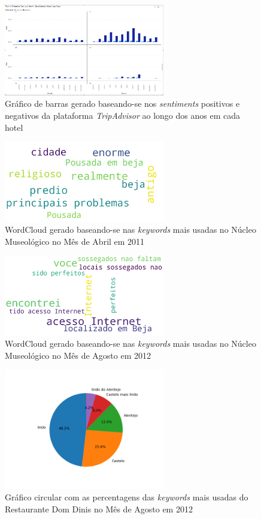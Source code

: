 \begin{figure}[!htb]
\centering
\includegraphics[width=7cm]{figuras/Pos&NegSentimentsPerMonth&BusinessType/2.PNG}
\caption{Gráfico de barras gerado baseando-se nos \textit{sentiments} positivos e negativos da plataforma \textit{TripAdvisor} ao longo dos anos em cada hotel}
\label{fig:exemplofig}
\end{figure}

\begin{figure}[!htb]
\centering
\includegraphics[width=7cm]{figuras/WordClouds/wordcloud_abril_of_2011_at_business33.png}
\caption{WordCloud gerado baseando-se nas \textit{keywords} mais usadas no Núcleo Museológico no Mês de Abril em 2011}
\label{fig:exemplofig}
\end{figure}

\begin{figure}[!htb]
\centering
\includegraphics[width=7cm]{figuras/WordClouds/wordcloud_agosto_of_2012_at_business33.png}
\caption{WordCloud gerado baseando-se nas \textit{keywords} mais usadas no Núcleo Museológico no Mês de Agosto em 2012}
\label{fig:exemplofig}
\end{figure}

\begin{figure}[!htb]
\centering
\includegraphics[width=7cm]{figuras/Graficos_Circulares_keyword/circular_keywords_agosto_of_2012_at_business2.png}
\caption{Gráfico circular com as percentagens das \textit{keywords} mais usadas do Restaurante Dom Dinis no Mês de Agosto em 2012}
\label{fig:exemplofig}
\end{figure}

